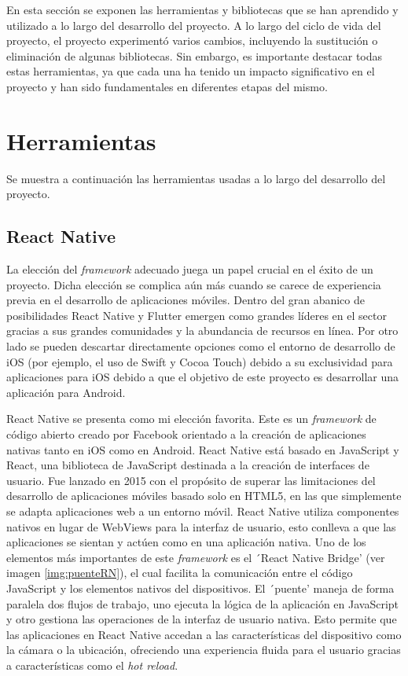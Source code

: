 
En esta sección se exponen las herramientas y bibliotecas que se han aprendido y utilizado a lo largo del desarrollo del proyecto.
A lo largo del ciclo de vida del proyecto, el proyecto experimentó varios cambios, incluyendo la sustitución o eliminación de algunas bibliotecas. Sin embargo, es importante destacar todas estas herramientas, ya que cada una ha tenido un impacto significativo en el proyecto y han sido fundamentales en diferentes etapas del mismo.

\section{Herramientas}

Se muestra a continuación las herramientas usadas a lo largo del desarrollo del proyecto.

\subsection{React Native}

La elección del \textit{framework} adecuado juega un papel crucial en el éxito de un proyecto. Dicha elección se complica aún más cuando se carece de experiencia previa en el desarrollo de aplicaciones móviles. Dentro del gran abanico de posibilidades React Native y Flutter emergen como grandes líderes en el sector gracias a sus grandes comunidades y la abundancia de recursos en línea. Por otro lado se pueden descartar directamente opciones como el entorno de desarrollo de iOS (por ejemplo, el uso de Swift y Cocoa Touch) debido a su exclusividad para aplicaciones para iOS debido a que el objetivo de este proyecto es desarrollar una aplicación para Android.

React Native se presenta como mi elección favorita. Este es un \textit{framework} de código abierto creado por Facebook orientado a la creación de aplicaciones nativas tanto en iOS como en Android. React Native está basado en JavaScript y React, una biblioteca de JavaScript destinada a la creación de interfaces de usuario. Fue lanzado en 2015 con el propósito de superar las limitaciones del desarrollo de aplicaciones móviles basado solo en HTML5, en las que simplemente se adapta aplicaciones web a un entorno móvil. React Native utiliza componentes nativos en lugar de WebViews para la interfaz de usuario, esto conlleva a que las aplicaciones se sientan y actúen como en una aplicación nativa.
Uno de los elementos más importantes de este \textit{framework} es el ´React Native Bridge' (ver imagen \ref{img:puenteRN}), el cual facilita la comunicación entre el código JavaScript y los elementos nativos del dispositivos. El ´puente' maneja de forma paralela dos flujos de trabajo, uno ejecuta la lógica de la aplicación en JavaScript y otro gestiona las operaciones de la interfaz de usuario nativa. Esto permite que las aplicaciones en React Native accedan a las características del dispositivo como la cámara o la ubicación, ofreciendo una experiencia fluida para el usuario gracias a características como el \textit{hot reload}.

